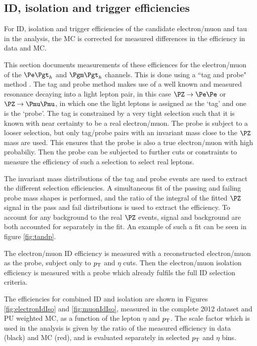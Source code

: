 \subsection{ID, isolation and trigger efficiencies}
\label{sec:idisotrigger}

For ID, isolation and trigger efficiencies of the candidate electron/muon 
and tau in the analysis, the \ac{MC} is corrected for measured differences in 
the efficiency in data and \ac{MC}.

This section documents measurements of these efficiences for the electron/muon 
of the $\etau$ and $\mutau$ channels. This is done using a ``tag and probe"
method \cite{Khachatryan:2010xn}.
The tag and probe method makes use of a well known and measured resonance decaying
into a light lepton pair, in this case $\PZ\to\Pe\Pe$ or $\PZ\to\Pmu\Pmu$, 
in which one the light leptons is assigned as the `tag' and one is the `probe'. 
The tag is constrained by a very tight selection such that it is known with near 
certainty to be a real electron/muon. The probe is subject to a looser selection, 
but only tag/probe pairs with an invariant mass close to the $\PZ$ mass are used. 
This ensures that the probe is also a true electron/muon with high probabiliy. 
Then the probe can be subjected to further cuts or constraints to measure the 
efficiency of such a selection to select real leptons.

The invariant mass distributions of the tag and probe events are used to extract
the different selection efficiencies. A simultaneous fit of the passing and failing probe 
mass shapes is performed, and the ratio of the integral of the fitted $\PZ$ signal 
in the pass and fail distributions is used to extract the efficiency. To account for any background
to the real $\PZ$ events, signal and background are both accounted for
separately in the fit. An example of such a fit can be seen in figure
\ref{fig:tandp}.

The electron/muon ID efficiency is measured with a reconstructed
electron/muon as the probe, subject only to $p_{\mathrm{T}}$ and $\eta$ cuts. 
Then the electron/muon isolation efficiency is measured
with a probe which already fulfils the full ID selection criteria. 

The efficiencies for combined ID and isolation are shown in Figures
\ref{fig:electronIdIso} and \ref{fig:muonIdIso}, measured in the complete 2012
dataset and PU weighted MC, as a function of the lepton $\eta$ and $p_{\mathrm{T}}$.
The scale factor which is used in the analysis is given by the ratio of the
measured efficiency in data (black) and MC (red), and is evaluated separately in
selected $p_{\mathrm{T}}$ and $\eta$ bins.

